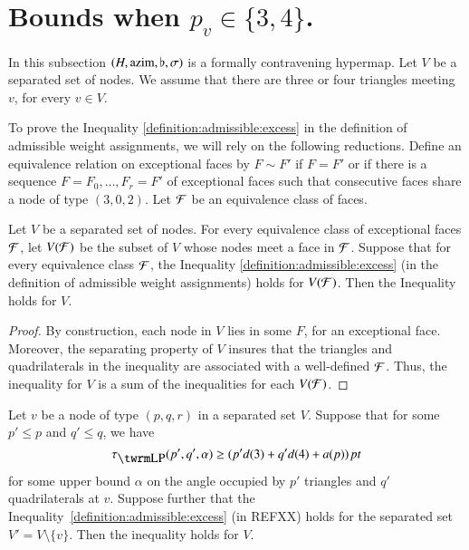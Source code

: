 \section{Bounds when $p_v\in\{3,4\}$.  } %
\label{sec:2.7} \label{sec:tri34}

In this subsection $(H,{\operatorname{azim}},\flat,\sigma)$ is a formally
contravening hypermap.  Let $V$ be a separated set of nodes.  We
assume that there are three or four triangles meeting $v$, for every
$v\in V$.

To prove the Inequality \ref{definition:admissible:excess} in the
definition of admissible weight assignments, we will rely on the
following reductions. Define an equivalence relation on exceptional
faces by $F\sim F'$ if $F=F'$ or if there is a sequence
$F=F_0,\ldots, F_r=F'$ of exceptional faces such that consecutive
faces share a node of type $(3,0,2)$. Let ${\cal F}$ be an
equivalence class of faces.


\begin{lemma} Let $V$ be a separated set of nodes.  For every
equivalence class of exceptional faces $\cal F$, let $V({\cal F})$
be the subset of $V$ whose nodes meet a face in ${\cal F}$. Suppose
that for every equivalence class $\cal F$, the Inequality
\ref{definition:admissible:excess} (in the definition of admissible
weight assignments) holds for $V({\cal F})$. Then the Inequality
holds for $V$.
\end{lemma}

\begin{proof}
By construction, each node in $V$ lies in some $F$, for an
exceptional face.  Moreover, the separating property of $V$ insures
that the triangles and quadrilaterals in the inequality are
associated with a well-defined  ${\cal F}$. Thus, the inequality for
$V$ is a sum of the inequalities for each $V({\cal F})$.
\end{proof}


\begin{lemma}
\label{lemma:split}
 Let $v$ be a node of type $(p,q,r)$ in a separated set $V$.  Suppose that
for some $p'\le p$ and $q'\le q$, we have
    $$\tauLP(p',q',\alpha) \ge ( p' d(3) + q' d(4) + a(p))\,\pt$$
for some upper bound $\alpha$ on the angle occupied by $p'$
triangles and $q'$ quadrilaterals at $v$.  Suppose further that the
Inequality~\ref{definition:admissible:excess} (in REFXX) holds for
the separated set $V' = V\setminus \{v\}$. Then the inequality holds
for $V$.
\end{lemma}

